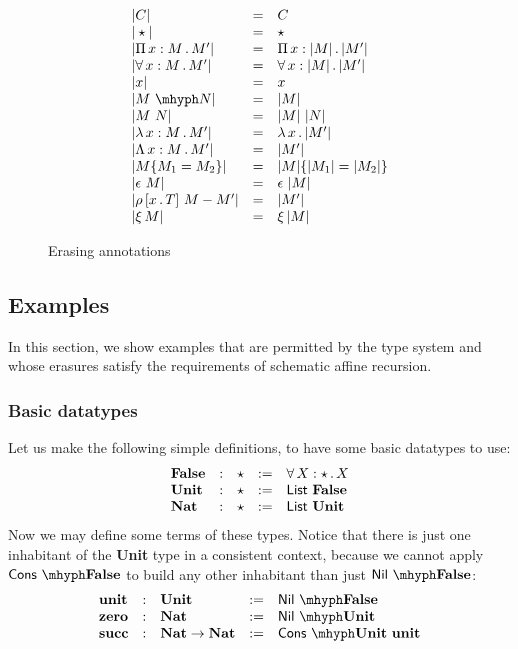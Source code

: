 \documentclass{article}
\begin{document}
\begin{figure}
  \[
  \begin{array}{lll}
    |C| & = & C \\
    |\star| & = & \star \\
    |\Pia{x}{M}{M'}| & = & \Pia{x}{|M|}{|M'|} \\
    |\allt{x}{M}{M'}| & = & \allt{x}{|M|}{|M'|} \\
    |x| & = & x \\
    |\appe{M}{N}| & = & |M| \\    
    |M\ N| & = & |M|\ |N| \\
    |\tlam{x}{M}{M'}| & = & \lam{x}{|M'|} \\
    |\Tlam{x}{M}{M'}| & = & |M'| \\
    |\eqtm{M_1}{M}{M_2}| & = & \eqtm{|M_1|}{|M|}{|M_2|}\\
    |\rfl{M}| & = & \rfl{|M|} \\
    |\cng{x}{T}{M}{M'}| & = & |M'| \\
    |\ext{M}| & = & \ext{|M|}
  \end{array}
  \]
  \caption{Erasing annotations}
  \label{fig:erase}
\end{figure}

\subsection{Examples}

In this section, we show examples that are permitted by the type
system and whose erasures satisfy the requirements of schematic affine
recursion.

\subsubsection{Basic datatypes}

Let us make the following simple definitions, to have some basic datatypes to use:
\[
\begin{array}{lllll}
  \textbf{False} & : & \star & := & \allt{X}{\star}{X} \\
  \textbf{Unit} & : & \star & := & \mathsf{List}\ \textbf{False} \\
  \textbf{Nat} & : & \star & := & \mathsf{List}\ \textbf{Unit}
\end{array}
\]
\noindent Now we may define some terms of these types. Notice that there is just one inhabitant of the \textbf{Unit} type
in a consistent context,
because we cannot apply $\appe{\mathsf{Cons}}{\textbf{False}}$ to build any other inhabitant than just $\appe{\mathsf{Nil}}{\textbf{False}}$:
\[
\begin{array}{lllll}
  \textbf{unit} & : & \textbf{Unit} & := & \appe{\mathsf{Nil}}{\textbf{False}} \\
  \textbf{zero} & : & \textbf{Nat} & := & \appe{\mathsf{Nil}}{\textbf{Unit}} \\
  \textbf{succ} & : & \textbf{Nat}\to\textbf{Nat} & := & \appe{\mathsf{Cons}}{\textbf{Unit}}\ \textbf{unit} \\
\end{array}
\]
\end{document}

